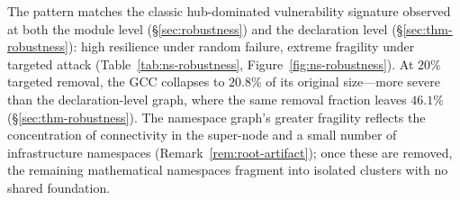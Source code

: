 The pattern matches the classic hub-dominated vulnerability signature observed at both the module level (\S\ref{sec:robustness}) and the declaration level (\S\ref{sec:thm-robustness}): high resilience under random failure, extreme fragility under targeted attack (Table~\ref{tab:ns-robustness}, Figure~\ref{fig:ns-robustness}). At $20\%$ targeted removal, the GCC collapses to $20.8\%$ of its original size---more severe than the declaration-level graph, where the same removal fraction leaves $46.1\%$ (\S\ref{sec:thm-robustness}). The namespace graph's greater fragility reflects the concentration of connectivity in the  super-node and a small number of infrastructure namespaces (Remark~\ref{rem:root-artifact}); once these are removed, the remaining mathematical namespaces fragment into isolated clusters with no shared foundation.
